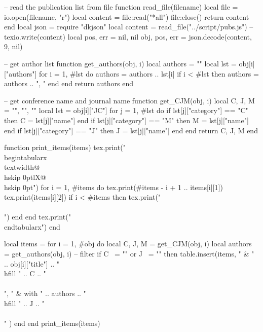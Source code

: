 \documentclass{article}
\begin{document}
\begin{luacode}
  -- read the publication list from file
  function read_file(filename)
    local file = io.open(filename, "r")
    local content = file:read("*all")
    file:close()
    return content
  end
  local json = require "dkjson"
  local content = read_file("../script/pubs.js")
  -- texio.write(content)
  local pos, err = nil, nil
  obj, pos, err = json.decode(content, 9, nil)
\end{luacode}


\begin{luacode}
  -- get author list
  function get_authors(obj, i) 
    local authors = ""
    local lst = obj[i]["authors"]
    for i = 1, #lst do
      authors = authors .. lst[i]
      if i < #lst then
        authors = authors .. ", "
      end
    end
    return authors
  end

  -- get conference name and journal name
  function get_CJM(obj, i)
    local C, J, M = "", "", "" 
    local lst = obj[i]["JC"]
    for j = 1, #lst do
      if lst[j]["category"] == "C" then
        C = lst[j]["name"]
      end
      if lst[j]["category"] == "M" then
        M = lst[j]["name"]
      end
      if lst[j]["category"] == "J" then
        J = lst[j]["name"]
      end
    end
    return C, J, M
  end

  function print_items(items)
    tex.print("\\begin{tabularx}{\\textwidth}{@{\\hskip 0pt}lX@{\\hskip 0pt}}")
    for i = 1, #items do
      tex.print(#items - i + 1 .. items[i][1])
      tex.print(items[i][2])
      if i < #items then
        tex.print("\\\\")
      end
    end
    tex.print("\\end{tabularx}")
  end
\end{luacode}

\begin{luacode}
  local items = {}
  for i = 1, #obj do
    local C, J, M = get_CJM(obj, i)
    local authors = get_authors(obj, i)
    -- filter
    if C ~= "" or J ~= "" then
      table.insert(items, {
        " & " .. obj[i]["title"] .. " \\hfill " .. C .. "\\\\",
        " & with " .. authors .. " \\hfill " .. J .. "\\\\"
      })
    end
  end
  print_items(items)
\end{luacode}
\end{document}
